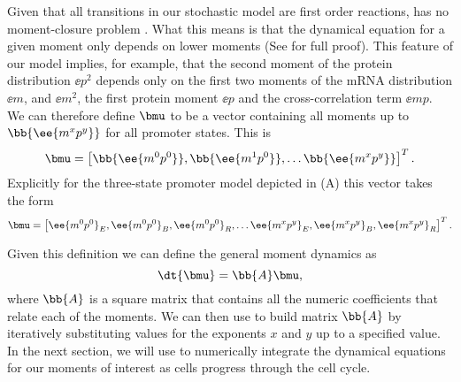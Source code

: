 Given that all transitions in our stochastic model are first order reactions,
 has no moment-closure problem \cite{Voliotis2014a}. What this
means is that the dynamical equation for a given moment only depends on lower
moments (See  for full proof). This feature of our model
implies, for example, that the second moment of the protein distribution
$\ee{p^2}$ depends only on the first two moments of the mRNA distribution
$\ee{m}$, and $\ee{m^2}$, the first protein moment $\ee{p}$  and the
cross-correlation term $\ee{mp}$. We can therefore define $\bmu$ to be a
vector containing all moments up to $\bb{\ee{m^x p^y}}$ for all promoter states.
This is
\begin{equation}
\bmu = \left[ \bb{\ee{m^0 p^0}},
							\bb{\ee{m^1 p^0}},
							\ldots \bb{\ee{m^x p^y}} \right]^T.
\end{equation}
Explicitly for the three-state promoter model depicted in
(A) this vector takes the form
\begin{equation}
	\bmu = \left[ \ee{m^0 p^0}_E, \ee{m^0 p^0}_B, \ee{m^0 p^0}_R,
	\ldots \ee{m^x p^y}_E, \ee{m^x p^y}_B, \ee{m^x p^y}_R \right]^T.
\end{equation}

Given this definition we can define the general moment dynamics as
\begin{equation}
\dt{\bmu} = \bb{A} \bmu,
\label{eq_mom_dynamics}
\end{equation}
where $\bb{A}$ is a square matrix that contains all the numeric coefficients
that relate each of the moments. We can then use  to build
matrix $\bb{A}$ by iteratively substituting values for the exponents $x$ and $y$
up to a specified value. In the next section, we will use 
to numerically integrate the dynamical equations for our moments of interest as
cells progress through the cell cycle.
